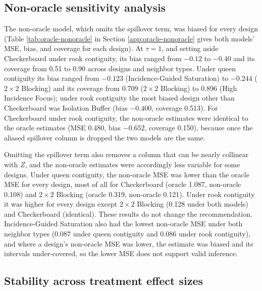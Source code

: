 \documentclass[11pt]{article}
\begin{document}
\subsection{Non-oracle sensitivity
analysis}\label{non-oracle-sensitivity-analysis}

The non-oracle model, which omits the spillover term, was biased for
every design (Table \ref{tab:oracle-nonoracle} in Section
\ref{app:oracle-nonoracle} gives both models' MSE, bias, and coverage
for each design). At \(\tau = 1\), and setting aside Checkerboard under
rook contiguity, its bias ranged from \(-0.12\) to \(-0.40\) and its
coverage from 0.51 to 0.90 across designs and neighbor types. Under
queen contiguity its bias ranged from \(-0.123\) (Incidence-Guided
Saturation) to \(-0.244\) (\(2\times2\) Blocking) and its
coverage from 0.709 (\(2\times2\) Blocking) to 0.896 (High Incidence
Focus); under rook contiguity the most biased design other than
Checkerboard was Isolation Buffer (bias \(-0.400\), coverage 0.513). For
Checkerboard under rook contiguity, the non-oracle estimates were
identical to the oracle estimates (MSE 0.480, bias \(-0.652\), coverage
0.150), because once the aliased spillover column is dropped the two
models are the same.

Omitting the spillover term also removes a column that can be nearly
collinear with \(Z\), and the non-oracle estimates were accordingly less
variable for some designs. Under queen contiguity, the non-oracle MSE
was lower than the oracle MSE for every design, most of all for
Checkerboard (oracle 1.087, non-oracle 0.108) and \(2\times2\) Blocking
(oracle 0.319, non-oracle 0.121). Under rook contiguity it was higher
for every design except \(2\times2\) Blocking (0.128 under both models)
and Checkerboard (identical). These results do not change the
recommendation. Incidence-Guided Saturation also had the
lowest non-oracle MSE under both neighbor types (0.087 under queen
contiguity and 0.086 under rook contiguity), and where a design's
non-oracle MSE was lower, the estimate was biased and its intervals
under-covered, so the lower MSE does not support valid inference.

\subsection{Stability across treatment effect
sizes}\label{stability-across-treatment-effect-sizes}
\end{document}
